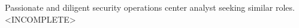 

\begin{cvparagraph}

Passionate and diligent security operations center analyst seeking similar roles. <INCOMPLETE>

\end{cvparagraph}